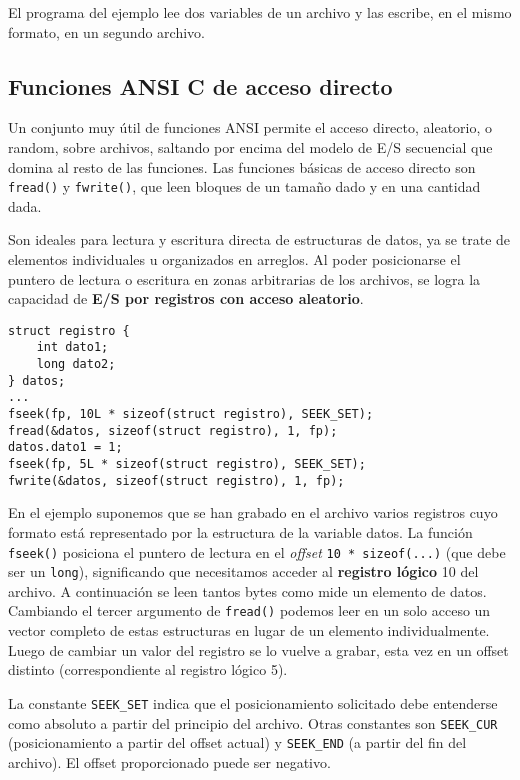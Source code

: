 El programa del ejemplo lee dos variables de un archivo y las escribe, en el
mismo formato, en un segundo archivo.

\subsection{Funciones ANSI C de acceso directo}
\label{subsec:esarchivosansicdirect}

Un conjunto muy útil de funciones ANSI permite el acceso directo, aleatorio, o
random, sobre archivos, saltando por encima del modelo de E/S secuencial que
domina al resto de las funciones. Las funciones básicas de acceso directo son
\lstinline{fread()} y \lstinline{fwrite()}, que leen bloques de un tamaño dado y en una cantidad dada.

Son ideales para lectura y escritura directa de estructuras de datos, ya se
trate de elementos individuales u organizados en arreglos. Al poder
posicionarse el puntero de lectura o escritura en zonas arbitrarias de los
archivos, se logra la capacidad de \textbf{E/S por registros con acceso aleatorio}.

\begin{ejemplo}
\begin{lstlisting}
struct registro {
    int dato1;
    long dato2;
} datos;
...
fseek(fp, 10L * sizeof(struct registro), SEEK_SET);
fread(&datos, sizeof(struct registro), 1, fp);
datos.dato1 = 1;
fseek(fp, 5L * sizeof(struct registro), SEEK_SET);
fwrite(&datos, sizeof(struct registro), 1, fp);
\end{lstlisting}
\end{ejemplo}

En el ejemplo suponemos que se han grabado en el archivo varios registros cuyo
formato está representado por la estructura de la variable datos. La función
\lstinline{fseek()} posiciona el puntero de lectura en el \textit{offset} \lstinline{10 * sizeof(...)} (que debe
ser un \lstinline{long}), significando que necesitamos acceder al \textbf{registro lógico} 10 del
archivo. A continuación se leen tantos bytes como mide un elemento de datos.
Cambiando el tercer argumento de \lstinline{fread()} podemos leer en un solo acceso un
vector completo de estas estructuras en lugar de un elemento individualmente.
Luego de cambiar un valor del registro se lo vuelve a grabar, esta vez en un
offset distinto (correspondiente al registro lógico 5).

La constante \lstinline{SEEK_SET} indica que el posicionamiento solicitado debe entenderse
como absoluto a partir del principio del archivo. Otras constantes son \lstinline{SEEK_CUR}
(posicionamiento a partir del offset actual) y \lstinline{SEEK_END} (a partir del fin del
archivo). El offset proporcionado puede ser negativo.

